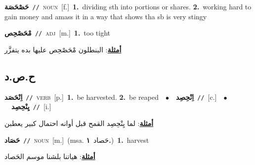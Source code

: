 \documentclass[10pt,a4paper,twoside]{article} %
\begin{document}
\begin{multicols}{2}
{\setlength\topsep{0pt}\textbf{\foreignlanguage{arabic}{حَصْحَصَة}}\ {\color{gray}\texttt{//}\color{black}}\ \textsc{noun}\ [f.]\ \textbf{1.}~dividing sth into portions or shares.  \textbf{2.}~working hard to gain money and amass it in a way that shows tha sb is very stingy\ } \vspace{2mm}

{\setlength\topsep{0pt}\textbf{\foreignlanguage{arabic}{مْحَصْحِص}}\ {\color{gray}\texttt{//}\color{black}}\ \textsc{adj}\ [m.]\ \textbf{1.}~too tight\  \begin{flushright}\color{gray}\foreignlanguage{arabic}{\textbf{\underline{\foreignlanguage{arabic}{أمثلة}}}: البنطلون مْحَصْحِص عليها بده يتفزَّر}\end{flushright}\color{black}} \vspace{2mm}

\vspace{-3mm}
\subsection*{\color{blue}\foreignlanguage{arabic}{ح.ص.د}\color{blue}{}} 

{\setlength\topsep{0pt}\textbf{\foreignlanguage{arabic}{اِنْحَصَد}}\ {\color{gray}\texttt{//}\color{black}}\ \textsc{verb}\ [p.]\ \textbf{1.}~be harvested.  \textbf{2.}~be reaped\ \ $\bullet$\ \ \setlength\topsep{0pt}\textbf{\foreignlanguage{arabic}{اِنْحِصِد}}\ {\color{gray}\texttt{//}\color{black}}\ [c.]\ \ $\bullet$\ \ \setlength\topsep{0pt}\textbf{\foreignlanguage{arabic}{يِنْحِصِد}}\ {\color{gray}\texttt{//}\color{black}}\ [i.]\  \begin{flushright}\color{gray}\foreignlanguage{arabic}{\textbf{\underline{\foreignlanguage{arabic}{أمثلة}}}: لما يِنْحِصِد القمح قبل أوانه احتمال كبير يعطبن}\end{flushright}\color{black}} \vspace{2mm}

{\setlength\topsep{0pt}\textbf{\foreignlanguage{arabic}{حَصَاد}}\ {\color{gray}\texttt{//}\color{black}}\ \textsc{noun}\ [m.]\ \color{gray}(msa. \foreignlanguage{arabic}{حَصاد}~\foreignlanguage{arabic}{\textbf{١.}})\color{black}\ \textbf{1.}~harvest\  \begin{flushright}\color{gray}\foreignlanguage{arabic}{\textbf{\underline{\foreignlanguage{arabic}{أمثلة}}}: هياتنا بلشنا موسم الحَصاد}\end{flushright}\color{black}} \vspace{2mm}


\end{multicols}
\end{document}
